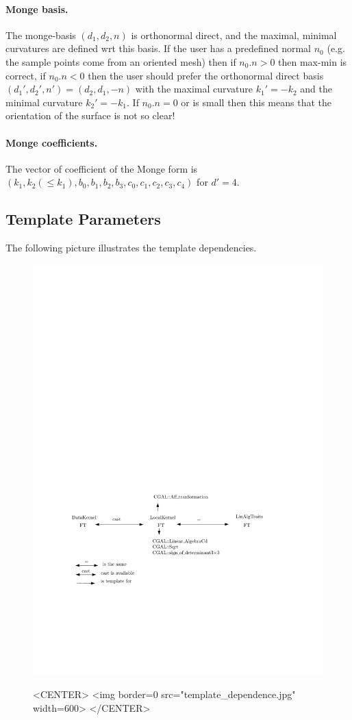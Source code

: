 \paragraph{Monge basis.} The monge-basis $(d_1,d_2,n)$ is orthonormal
direct, and the maximal, minimal curvatures are defined wrt this
basis. If the user has a predefined normal $n_0$ (e.g. the sample
points come from an oriented mesh) then if $n_0 . n >0$ then max-min is
correct, if $n_0 . n <0$ then the user should prefer the orthonormal
direct basis $(d_1',d_2',n')=(d_2,d_1,-n)$ with the maximal curvature
$k_1'=-k_2$ and the minimal curvature $k_2'=-k_1$. If $n_0 . n =0$ or
is small then this means that the orientation of the surface is not so
clear!

\paragraph{Monge coefficients.}
The vector of coefficient of the Monge form is $(k_1, k_2 (\leq k_1),
b_0, b_1, b_2, b_3, c_0, c_1, c_2, c_3, c_4)$ for $d' = 4$.

\subsection{Template Parameters}

The following picture illustrates the template dependencies.
\begin{figure}[!ht]
\begin{ccTexOnly}
\centerline{
\includegraphics[width=.5\linewidth]{Jet_fitting_3_ref/template_dependence}}
\end{ccTexOnly}


\begin{ccHtmlOnly}
<CENTER>
<img border=0 src="template_dependence.jpg" width=600>
</CENTER>
\end{ccHtmlOnly}
\end{figure}

